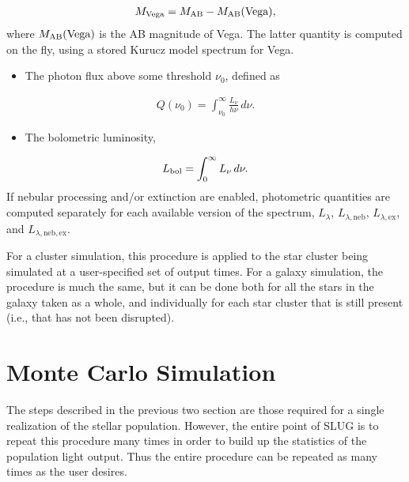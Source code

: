 \documentclass[letterpaper,10pt,english]{sphinxmanual}
\begin{document}
\begin{equation*}
\begin{split}M_{\rm Vega} = M_{\rm AB} - M_{\rm AB}(\mbox{Vega}),\end{split}
\end{equation*}
where \(M_{\rm AB}(\mbox{Vega})\) is the AB magnitude of Vega. The latter quantity is computed on the fly, using a stored Kurucz model spectrum for Vega.
\begin{itemize}
\item {} 
The photon flux above some threshold \(\nu_0\), defined as

\end{itemize}
\begin{equation*}
\begin{split}Q(\nu_0) = \int_{\nu_0}^\infty \frac{L_\nu}{h\nu} \, d\nu.\end{split}
\end{equation*}\begin{itemize}
\item {} 
The bolometric luminosity,

\end{itemize}
\begin{equation*}
\begin{split}L_{\rm bol} = \int_0^\infty L_\nu \, d\nu.\end{split}
\end{equation*}
If nebular processing and/or extinction are enabled, photometric quantities are computed separately for each available version of the spectrum, \(L_\lambda\), \(L_{\lambda,\mathrm{neb}}\), \(L_{\lambda,\mathrm{ex}}\), and \(L_{\lambda,\mathrm{neb,ex}}\).

For a cluster simulation, this procedure is applied to the star cluster being simulated at a user-specified set of output times. For a galaxy simulation, the procedure is much the same, but it can be done both for all the stars in the galaxy taken as a whole, and individually for each star cluster that is still present (i.e., that has not been disrupted).


\section{Monte Carlo Simulation}
\label{\detokenize{intro:monte-carlo-simulation}}
The steps described in the previous two section are those required for a single realization of the stellar population. However, the entire point of SLUG is to repeat this procedure many times in order to build up the statistics of the population light output. Thus the entire procedure can be repeated as many times as the user desires.
\end{document}
